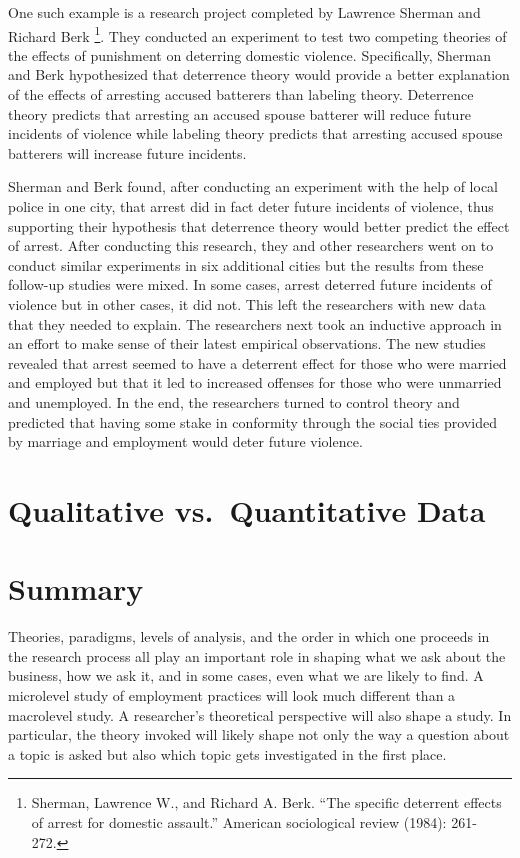 \documentclass[]{book}
\let\rmarkdownfootnote\footnote%
\def\footnote{\protect\rmarkdownfootnote}
\theoremstyle{definition}
\theoremstyle{definition}
\theoremstyle{definition}
\theoremstyle{remark}
\begin{document}
One such example is a research project completed by Lawrence Sherman and
Richard Berk \footnote{Sherman, Lawrence W., and Richard A. Berk. ``The
  specific deterrent effects of arrest for domestic assault.'' American
  sociological review (1984): 261-272.}. They conducted an experiment to
test two competing theories of the effects of punishment on deterring
domestic violence. Specifically, Sherman and Berk hypothesized that
deterrence theory would provide a better explanation of the effects of
arresting accused batterers than labeling theory. Deterrence theory
predicts that arresting an accused spouse batterer will reduce future
incidents of violence while labeling theory predicts that arresting
accused spouse batterers will increase future incidents.

Sherman and Berk found, after conducting an experiment with the help of
local police in one city, that arrest did in fact deter future incidents
of violence, thus supporting their hypothesis that deterrence theory
would better predict the effect of arrest. After conducting this
research, they and other researchers went on to conduct similar
experiments in six additional cities but the results from these
follow-up studies were mixed. In some cases, arrest deterred future
incidents of violence but in other cases, it did not. This left the
researchers with new data that they needed to explain. The researchers
next took an inductive approach in an effort to make sense of their
latest empirical observations. The new studies revealed that arrest
seemed to have a deterrent effect for those who were married and
employed but that it led to increased offenses for those who were
unmarried and unemployed. In the end, the researchers turned to control
theory and predicted that having some stake in conformity through the
social ties provided by marriage and employment would deter future
violence.

\hypertarget{qualitative-vs.quantitative-data}{%
\section{Qualitative vs.~Quantitative
Data}\label{qualitative-vs.quantitative-data}}

\hypertarget{summary-1}{%
\section{Summary}\label{summary-1}}

Theories, paradigms, levels of analysis, and the order in which one
proceeds in the research process all play an important role in shaping
what we ask about the business, how we ask it, and in some cases, even
what we are likely to find. A microlevel study of employment practices
will look much different than a macrolevel study. A researcher's
theoretical perspective will also shape a study. In particular, the
theory invoked will likely shape not only the way a question about a
topic is asked but also which topic gets investigated in the first
place.
\end{document}
